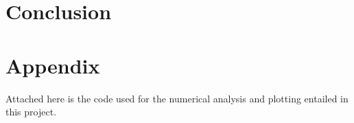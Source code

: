 \documentclass[11pt, a4paper]{article}
\begin{document}
\section{Conclusion}




\newpage
\section*{Appendix}
Attached here is the code used for the numerical analysis and plotting entailed in this project.
%
\end{document}
